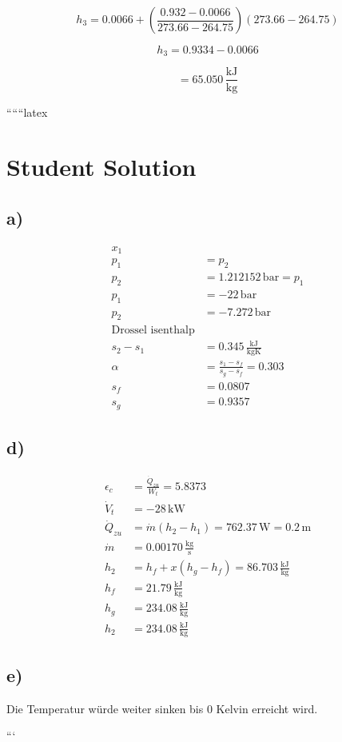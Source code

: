 \[
h_3 = 0.0066 + \left( \frac{0.932 - 0.0066}{273.66 - 264.75} \right) (273.66 - 264.75)
\]

\[
h_3 = 0.9334 - 0.0066
\]

\[
= 65.050 \, \frac{\text{kJ}}{\text{kg}}
\]

``````latex


\section*{Student Solution}

\subsection*{a)}
\begin{align*}
x_1 \\
p_1 &= p_2 \\
p_2 &= 1.212152 \, \text{bar} = p_1 \\
p_1 &= -22 \, \text{bar} \\
p_2 &= -7.272 \, \text{bar} \\
\text{Drossel isenthalp} \\
s_2 - s_1 &= 0.345 \, \frac{\text{kJ}}{\text{kgK}} \\
\alpha &= \frac{s_1 - s_f}{s_g - s_f} = 0.303 \\
s_f &= 0.0807 \\
s_g &= 0.9357
\end{align*}

\subsection*{d)}
\begin{align*}
\epsilon_c &= \frac{\dot{Q}_{zu}}{W_t} = 5.8373 \\
\dot{V}_t &= -28 \, \text{kW} \\
\dot{Q}_{zu} &= \dot{m} (h_2 - h_1) = 762.37 \, \text{W} = 0.2 \, \text{m} \\
\dot{m} &= 0.00170 \, \frac{\text{kg}}{\text{s}} \\
h_2 &= h_f + x(h_g - h_f) = 86.703 \, \frac{\text{kJ}}{\text{kg}} \\
h_f &= 21.79 \, \frac{\text{kJ}}{\text{kg}} \\
h_g &= 234.08 \, \frac{\text{kJ}}{\text{kg}} \\
h_2 &= 234.08 \, \frac{\text{kJ}}{\text{kg}}
\end{align*}

\subsection*{e)}
Die Temperatur würde weiter sinken bis 0 Kelvin erreicht wird.

```